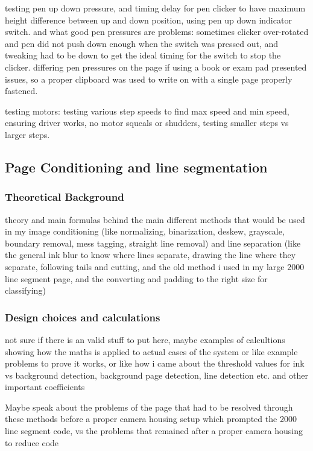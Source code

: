 testing pen up down pressure, and timing delay for pen clicker to have maximum height difference between up and down position, using pen up down indicator switch. and what good pen pressures are 
 problems: sometimes clicker over-rotated and pen did not push down enough when the switch was pressed out, and tweaking had to be down to get the ideal timing for the switch to stop the clicker. differing pen pressures on the page if using a book or exam pad presented issues, so a proper clipboard was used to write on with a single page properly fastened.



testing motors: testing various step speeds to find max speed and min speed, ensuring driver works, no motor squeals or shudders, testing smaller steps vs larger steps.





\subsection{Page Conditioning and line segmentation}
\subsubsection{Theoretical Background}
theory and main formulas behind the main different methods that would be used in my image conditioning (like normalizing, binarization, deskew, grayscale, boundary removal, mess tagging, straight line removal) and line separation (like the general ink blur to know where lines separate, drawing the line where they separate, following tails and cutting, and the old method i used in my large 2000 line segment page, and the converting and padding to the right size for classifying)
\subsubsection{Design choices and calculations}
not sure if there is an valid stuff to put here, maybe examples of calcultions showing how the maths is applied to actual cases of the system or like example problems to prove it works, or like how i came about the threshold values for ink vs background detection, background page detection, line detection etc. and other important coefficients

Maybe speak about the problems of the page that had to be resolved through these methods before a proper camera housing setup which prompted the 2000 line segment code, vs the problems that remained after a proper camera housing to reduce code
